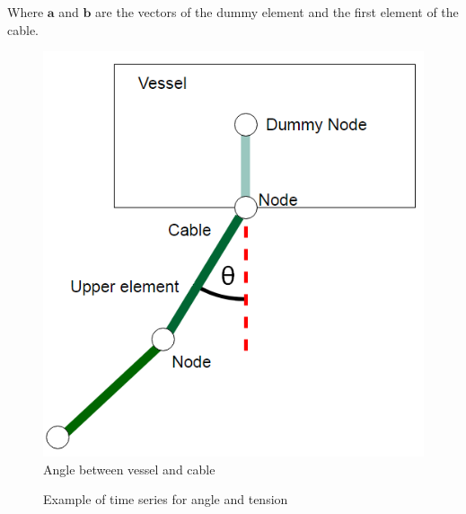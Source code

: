 Where $\boldsymbol{a}$ and $\boldsymbol{b}$ are the vectors of the dummy element and the first element of the cable. 

\begin{figure}[H]
\centering
\includegraphics[scale=0.5]{figures/angle}
\caption[$\; \:$Angle between vessel and cable ]{Angle between vessel and cable  }
 \label{fig:angle}
\end{figure}

\begin{figure}[H]
\hfill
{}\hfill
\caption[$\; \:$Example of time series for angle and tension]{Example of time series for angle and tension}
\label{fig:timeex}
\end{figure}

